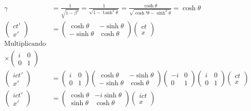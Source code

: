 \documentclass[a4paper,12pt]{article}
\begin{document}
\begin{align*}
\gamma &= \frac{1}{\sqrt{1-\beta^2}   } = \frac{1}{\sqrt{1-\tanh^2\theta }} = \frac{\cosh \theta}{\sqrt{\cosh²\theta -\sinh^2\theta} } = \cosh\theta \\
\begin{pmatrix}ct' \\x'\end{pmatrix} &= \begin{pmatrix}
    \cosh \theta &-\sinh \theta \\ - \sinh\theta & \cosh\theta 
\end{pmatrix} \begin{pmatrix}
    ct \\x
\end{pmatrix} \\
\text{Multiplicando por} \\
\times \begin{pmatrix}    i&0\\0&1\end{pmatrix} & \\
    \begin{pmatrix} ict' \\x'\end{pmatrix} &= \begin{pmatrix}
    i&0\\0&1\end{pmatrix}\begin{pmatrix}
    \cosh \theta &-\sinh \theta \\ - \sinh\theta & \cosh\theta 
\end{pmatrix}\begin{pmatrix}
    -i&0\\0&1\end{pmatrix} \begin{pmatrix}
    i&0\\0&1\end{pmatrix}  \begin{pmatrix}
    ct \\x
\end{pmatrix}\\
\begin{pmatrix}ict' \\x'\end{pmatrix} &= \begin{pmatrix}
    \cosh \theta &- i\sinh \theta \\  \sinh\theta & \cosh\theta 
\end{pmatrix} \begin{pmatrix}
    ict \\x
\end{pmatrix}
\end{align*}
\end{document}
